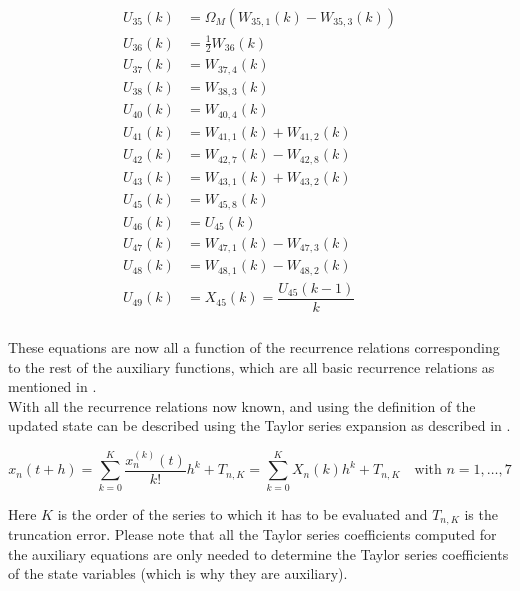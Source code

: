 \begin{align} \label{eq:allRecRel4}
\begin{split}
U_{35} \left(k\right)&= \Omega_{M}\left(W_{35,1}\left(k\right)-W_{35,3}\left(k\right)\right) \\ 
U_{36} \left(k\right)&= \frac{1}{2}W_{36}\left(k\right) \\
U_{37} \left(k\right)&= W_{37,4}\left(k\right) \\
U_{38} \left(k\right)&= W_{38,3}\left(k\right) \\
U_{40} \left(k\right)&= W_{40,4}\left(k\right) \\
U_{41} \left(k\right)&= W_{41,1}\left(k\right)+W_{41,2}\left(k\right) \\
U_{42} \left(k\right)&= W_{42,7}\left(k\right)-W_{42,8}\left(k\right) \\
U_{43} \left(k\right)&= W_{43,1}\left(k\right)+W_{43,2}\left(k\right) \\
U_{45} \left(k\right)&= W_{45,8}\left(k\right) \\
U_{46} \left(k\right)&= U_{45} \left(k\right) \\
U_{47} \left(k\right) &= W_{47,1}\left(k\right)-W_{47,3}\left(k\right) \\
U_{48} \left(k\right) &= W_{48,1}\left(k\right)-W_{48,2}\left(k\right) \\
U_{49}\left(k\right)&=X_{45}\left(k\right)=\dfrac{U_{45}\left(k-1\right)}{k}\\
\end{split}
\end{align}

These equations are now all a function of the recurrence relations corresponding to the rest of the auxiliary functions, which are all basic recurrence relations as mentioned in . \\

With all the recurrence relations now known, and using the definition of  the updated state can be described using the Taylor series expansion as described in .

\begin{equation} \label{eq:TSexp}
x_{n}\left(t+h\right)=\displaystyle\sum_{k=0}^{K}\dfrac{x_{n}^{\left( k\right)}\left(t\right)}{k!}h^{k}+T_{n,K}=\displaystyle\sum_{k=0}^{K}X_{n}\left( k \right) h^{k}+T_{n,K} \quad \text{with }n=1,\dotsc,7
\end{equation}

Here $K$ is the order of the series to which it has to be evaluated and $T_{n,K}$ is the truncation error. Please note that all the Taylor series coefficients computed for the auxiliary equations are only needed to determine the Taylor series coefficients of the state variables (which is why they are auxiliary).

